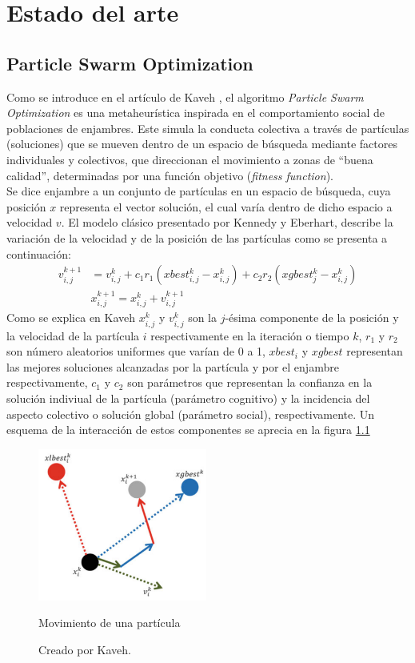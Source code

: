 
\chapter{Estado del arte}
\section{Particle Swarm Optimization}
Como se introduce en el artículo de Kaveh \cite{Psoexplain14}, el algoritmo \emph{Particle Swarm Optimization} es una metaheurística inspirada en el comportamiento social de poblaciones de enjambres. Este simula la conducta colectiva a través de partículas (soluciones) que se mueven dentro de un espacio de búsqueda mediante factores individuales y colectivos, que direccionan el movimiento a zonas de ``buena calidad'', determinadas por una función objetivo (\emph{fitness function}).\\
Se dice enjambre a un conjunto de partículas en un espacio de búsqueda, cuya posición $x$ representa el vector solución, el cual varía dentro de dicho espacio a velocidad $v$. El modelo clásico presentado por Kennedy y Eberhart\cite{Kennedy95}, describe la variación de la velocidad y de la posición de las partículas como se presenta a continuación:
\begin{align}
    v_{i,j}^{k+1} &= v_{i,j}^{k} + c_{1}r_{1}(xbest_{i,j}^k - x_{i,j}^k) + c_{2}r_{2}(xgbest_{j}^{k} - x_{i,j}^k)\\
    &x_{i,j}^{k+1} = x_{i,j}^{k} + v_{i,j}^{k+1}
\end{align}    
Como se explica en Kaveh \cite{Psoexplain14} $x_{i,j}^{k}$ y $v_{i,j}^{k}$ son la $j$-ésima componente de la posición y la velocidad de la partícula $i$ respectivamente en la iteración o tiempo $k$, $r_{1}$ y $r_{2}$ son número aleatorios uniformes que varían de 0 a 1, $xbest_i$ y $xgbest$ representan las mejores soluciones alcanzadas por la partícula y por el enjambre respectivamente, $c_1$ y $c_2$ son parámetros que representan la confianza en la solución indiviual de la partícula (parámetro cognitivo) y la incidencia del aspecto colectivo o solución global (parámetro social), respectivamente. Un esquema de la interacción de estos componentes se aprecia en la figura \ref{fig:move_part}\\
\begin{figure}[h!]
    \centering    
    \includegraphics[height=50mm]{figures/move_particle.png} 
    \caption{Movimiento de una partícula}
    \vspace{-.25cm} 
    \caption*{Creado por Kaveh\cite{Psoexplain14}.}
    \label{fig:move_part}
\end{figure}
